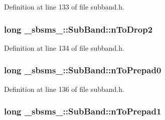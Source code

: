 Definition at line 133 of file subband.\+h.

\subsubsection[{\texorpdfstring{n\+To\+Drop2}{nToDrop2}}]{\setlength{\rightskip}{0pt plus 5cm}long \+\_\+sbsms\+\_\+\+::\+Sub\+Band\+::n\+To\+Drop2\hspace{0.3cm}{\ttfamily [protected]}}\hypertarget{class__sbsms___1_1_sub_band_a21a314ec07891cf67531ba3767b4f9c4}{}\label{class__sbsms___1_1_sub_band_a21a314ec07891cf67531ba3767b4f9c4}


Definition at line 134 of file subband.\+h.

\subsubsection[{\texorpdfstring{n\+To\+Prepad0}{nToPrepad0}}]{\setlength{\rightskip}{0pt plus 5cm}long \+\_\+sbsms\+\_\+\+::\+Sub\+Band\+::n\+To\+Prepad0\hspace{0.3cm}{\ttfamily [protected]}}\hypertarget{class__sbsms___1_1_sub_band_a298d1d8b8263bf4ebdcbf84b08b7ed5c}{}\label{class__sbsms___1_1_sub_band_a298d1d8b8263bf4ebdcbf84b08b7ed5c}


Definition at line 136 of file subband.\+h.

\subsubsection[{\texorpdfstring{n\+To\+Prepad1}{nToPrepad1}}]{\setlength{\rightskip}{0pt plus 5cm}long \+\_\+sbsms\+\_\+\+::\+Sub\+Band\+::n\+To\+Prepad1\hspace{0.3cm}{\ttfamily [protected]}}\hypertarget{class__sbsms___1_1_sub_band_a9193fa388ed4637d6583982001e271e5}{}\label{class__sbsms___1_1_sub_band_a9193fa388ed4637d6583982001e271e5}


